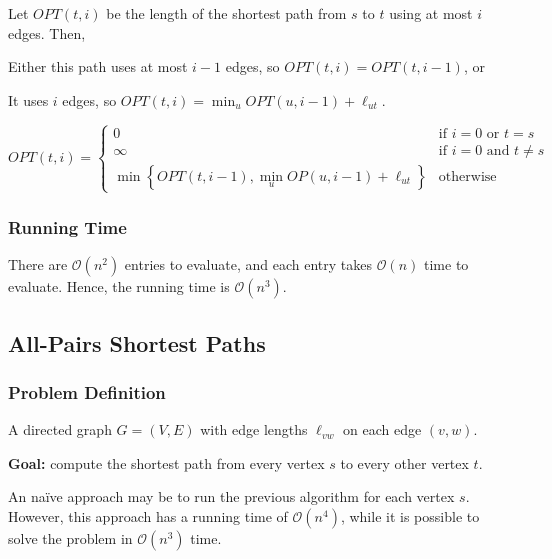 Let $OPT(t, i)$ be the length of the shortest path from $s$ to $t$ using at most $i$ edges. Then,
\begin{listu}
    \item Either this path uses at most $i - 1$ edges, so $OPT(t, i) = OPT(t, i - 1)$, or
    \item It uses $i$ edges, so $\displaystyle OPT(t, i) = \min_{u} OPT(u, i - 1) + \ell_{ut}$.
\end{listu} \[
    OPT(t, i) = \begin{cases} 
        0                                                                     & \text{if } i = 0 \text{ or } t = s    \\
        \infty                                                                & \text{if } i = 0 \text{ and } t \ne s \\
        \displaystyle
        \min\left\{ OPT(t, i - 1), \min_{u} OP(u, i - 1) + \ell_{ut} \right\} & \text{otherwise}
    \end{cases}
\]

\subsubsection{Running Time}

There are $\mathcal{O}(n^2)$ entries to evaluate, and each entry takes $\mathcal{O}(n)$ time to evaluate. Hence, the running time is $\mathcal{O}(n^3)$.

\subsection{All-Pairs Shortest Paths}

\subsubsection{Problem Definition}

\begin{listu}
    \item A directed graph $G = (V, E)$ with edge lengths $\ell_{vw}$ on each edge $(v, w)$.
    \item \textbf{Goal:} compute the shortest path from every vertex $s$ to every other vertex $t$.
\end{listu}

An na\"ive approach may be to run the previous algorithm for each vertex $s$. However, this approach has a running time of $\mathcal{O}(n^4)$, while it is possible to solve the problem in $\mathcal{O}(n^3)$ time.

